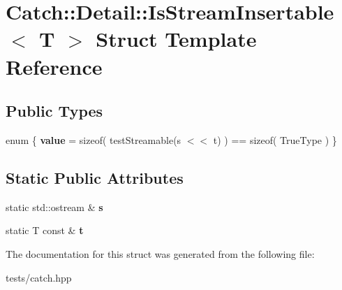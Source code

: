\hypertarget{struct_catch_1_1_detail_1_1_is_stream_insertable}{}\section{Catch\+:\+:Detail\+:\+:Is\+Stream\+Insertable$<$ T $>$ Struct Template Reference}
\label{struct_catch_1_1_detail_1_1_is_stream_insertable}
\subsection*{Public Types}
\begin{DoxyCompactItemize}
\item 
\mbox{\label{struct_catch_1_1_detail_1_1_is_stream_insertable_a2e4508694da3bf368ff67733a7970edd}} 
enum \{ {\bfseries value} = sizeof( test\+Streamable(s $<$$<$ t) ) == sizeof( True\+Type )
 \}
\end{DoxyCompactItemize}
\subsection*{Static Public Attributes}
\begin{DoxyCompactItemize}
\item 
\mbox{\label{struct_catch_1_1_detail_1_1_is_stream_insertable_abe3d3c8e5d85665747faafffc9a96b00}} 
static std\+::ostream \& {\bfseries s}
\item 
\mbox{\label{struct_catch_1_1_detail_1_1_is_stream_insertable_a7d2a3da978b6736667a7b2f6d51f507f}} 
static T const  \& {\bfseries t}
\end{DoxyCompactItemize}


The documentation for this struct was generated from the following file\+:\begin{DoxyCompactItemize}
\item 
tests/catch.\+hpp\end{DoxyCompactItemize}
